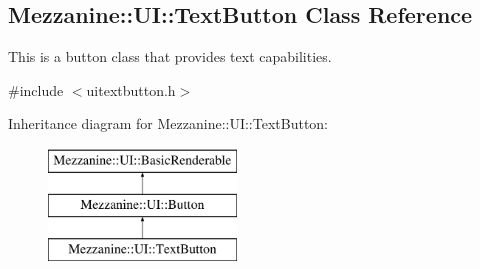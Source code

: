 \hypertarget{classMezzanine_1_1UI_1_1TextButton}{
\subsection{Mezzanine::UI::TextButton Class Reference}
\label{classMezzanine_1_1UI_1_1TextButton}
}


This is a button class that provides text capabilities.  




{\ttfamily \#include $<$uitextbutton.h$>$}

Inheritance diagram for Mezzanine::UI::TextButton:\begin{figure}[H]
\begin{center}
\leavevmode
\includegraphics[height=3.000000cm]{classMezzanine_1_1UI_1_1TextButton}
\end{center}
\end{figure}
